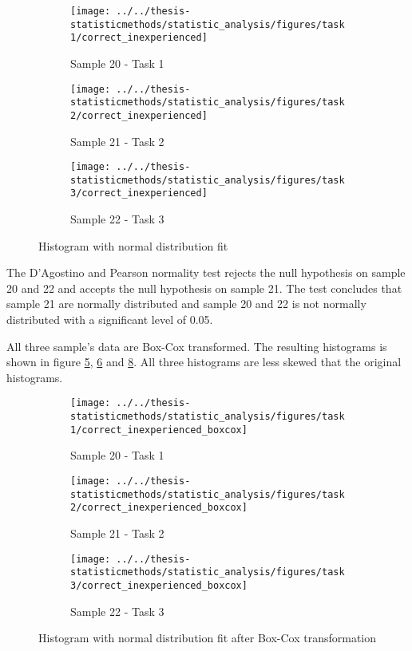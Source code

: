 \begin{figure}[H]
	\centering
	\begin{subfigure}[b]{0.32\textwidth}
		\centering
		\texttt{[image: ../../thesis-statisticmethods/statistic\_analysis/figures/task1/correct\_inexperienced]}
		\caption{Sample 20 - Task 1}
		\label{fig:correctinexperienced_task1}
	\end{subfigure}
	\begin{subfigure}[b]{0.32\textwidth}
		\centering
		\texttt{[image: ../../thesis-statisticmethods/statistic\_analysis/figures/task2/correct\_inexperienced]}
		\caption{Sample 21 - Task 2}
		\label{fig:correctinexperienced_task2}
	\end{subfigure}
	\begin{subfigure}[b]{0.32\textwidth}
		\centering
		\texttt{[image: ../../thesis-statisticmethods/statistic\_analysis/figures/task3/correct\_inexperienced]}
		\caption{Sample 22 - Task 3}
		\label{fig:correctinexperienced_task3}
	\end{subfigure}
	\caption{Histogram with normal distribution fit}
\end{figure}

The D'Agostino and Pearson normality test rejects the null hypothesis on sample 20 and 22 and accepts the null hypothesis on sample 21. The test concludes that sample 21 are normally distributed and sample 20 and 22 is not normally distributed with a significant level of 0.05. \newline

All three sample's data are Box-Cox transformed. The resulting histograms is shown in figure \ref{fig:correctinexperiencedboxcox_task1}, \ref{fig:correctinexperiencedboxcox_task2} and \ref{fig:correctinexperiencedboxcox_task3}. All three histograms are less skewed that the original histograms.

\begin{figure}[H]
	\centering
	\begin{subfigure}[b]{0.32\textwidth}
		\centering
		\texttt{[image: ../../thesis-statisticmethods/statistic\_analysis/figures/task1/correct\_inexperienced\_boxcox]}
		\caption{Sample 20 - Task 1}
		\label{fig:correctinexperiencedboxcox_task1}
	\end{subfigure}
	\begin{subfigure}[b]{0.32\textwidth}
		\centering
		\texttt{[image: ../../thesis-statisticmethods/statistic\_analysis/figures/task2/correct\_inexperienced\_boxcox]}
		\caption{Sample 21 - Task 2}
		\label{fig:correctinexperiencedboxcox_task2}
	\end{subfigure}
	\begin{subfigure}[b]{0.32\textwidth}
		\centering
		\texttt{[image: ../../thesis-statisticmethods/statistic\_analysis/figures/task3/correct\_inexperienced\_boxcox]}
		\caption{Sample 22 - Task 3}
		\label{fig:correctinexperiencedboxcox_task3}
	\end{subfigure}
	\caption{Histogram with normal distribution fit after Box-Cox transformation}
\end{figure}

